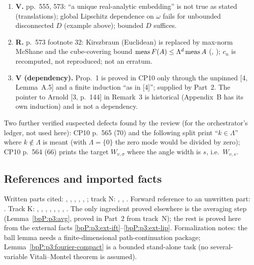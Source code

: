 \begin{enumerate}[label=(E\arabic*)]
\item \textbf{V.} pp.~555, 573: ``a unique real-analytic embedding'' is not true as stated (translations); global Lipschitz dependence on $\omega$ fails for unbounded disconnected $D$ (example above); bounded $D$ suffices.
\item \textbf{R.} p.~573 footnote 32: Kirszbraun (Euclidean) is replaced by max-norm McShane and the cube-covering bound $\operatorname{meas} F(A)\le\Lambda^d\operatorname{meas} A$ (, ); $c_n$ is recomputed, not reproduced; not an erratum.
\item \textbf{V (dependency).} Prop.~1 is proved in CP10 only through the unpinned [4, Lemma~A.5] and a finite induction ``as in [4]''; supplied by Part~2. The pointer to Arnold [3, p.~144] in Remark~3 is historical (Appendix~B has its own induction) and is not a dependency.
\end{enumerate}
Two further verified suspected defects found by the review (for the orchestrator's ledger, not used here): CP10 p.~565 (70) and the following split print ``$k\in\Lambda$'' where $k\notin\Lambda$ is meant (with $\Lambda=\{0\}$ the zero mode would be divided by zero); CP10 p.~564 (66) prints the target $W_{v,\sigma}$ where the angle width is $s$, i.e.\ $W_{v,s}$.

\subsection{References and imported facts}\label{bpP:p3:forward}

Written parts cited: , , , , , ; track N: , , . Forward reference to an unwritten part: . Track K: , , , , , , , .
The only ingredient proved elsewhere is the averaging step (Lemma~\ref{bpP:p3:avg}, proved in Part~2 from track~N); the rest is proved here from the external facts \ref{bpP:p3:ext-ift}--\ref{bpP:p3:ext-lip}. Formalization notes: the ball lemma needs a finite-dimensional path-continuation package; Lemma~\ref{bpP:p3:fourier-compact} is a bounded stand-alone task (no several-variable Vitali--Montel theorem is assumed).
